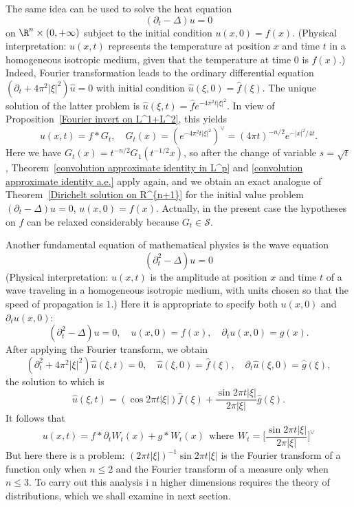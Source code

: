 The same idea can be used to solve the heat equation
\[(\partial_t-\Delta)u=0\]
on $\R^n\times(0,+\infty)$ subject to the initial condition $u(x,0)=f(x)$. (Physical interpretation: $u(x,t)$ represents the temperature at position $x$ and time $t$ in a homogeneous isotropic medium, given that the temperature at time $0$ is $f(x)$.) Indeed, Fourier transformation leads to the ordinary differential equation $(\partial_t+4\pi^2|\xi|^2)\hat{u}=0$ with initial condition $\hat{u}(\xi,0)=\hat{f}(\xi)$. The unique solution of the latter problem is $\hat{u}(\xi,t)=\hat{f}e^{-4\pi^2t|\xi|^2}$. In view of Proposition~\ref{Fourier invert on L^1+L^2}, this yields
\[u(x,t)=f\ast G_t,\quad G_t(x)=(e^{-4\pi^2t|\xi|^2})^{\vee}=(4\pi t)^{-n/2}e^{-|x|^2/4t}.\]
Here we have $G_t(x)=t^{-n/2}G_1(t^{-1/2}x)$, so after the change of variable $s=\sqrt{t}$, Theorem~\ref{convolution approximate identity in L^p} and \ref{convolution approximate identity a.e.} apply again, and we obtain an exact analogue of Theorem~\ref{Dirichelt solution on R^{n+1}} for the initial value problem $(\partial_t-\Delta)u=0$, $u(x,0)=f(x)$. Actually, in the present case the hypotheses on $f$ can be relaxed considerably because $G_t\in\mathscr{S}$.\par
Another fundamental equation of mathematical physics is the wave equation
\[(\partial_t^2-\Delta)u=0\]
(Physical interpretation: $u(x,t)$ is the amplitude at position $x$ and time $t$ of a wave traveling in a homogeneous isotropic medium, with units chosen so that the speed of propagation is $1$.) Here it is appropriate to specify both $u(x,0)$ and $\partial_tu(x,0)$:
\[(\partial_t^2-\Delta)u=0,\quad u(x,0)=f(x),\quad \partial_tu(x,0)=g(x).\]
After applying the Fourier transform, we obtain
\[(\partial_t^2+4\pi^2|\xi|^2)\hat{u}(\xi,t)=0,\quad \hat{u}(\xi,0)=\hat{f}(\xi),\quad \partial_t\hat{u}(\xi,0)=\hat{g}(\xi),\]
the solution to which is
\[\hat{u}(\xi,t)=(\cos 2\pi t|\xi|)\hat{f}(\xi)+\frac{\sin 2\pi t|\xi|}{2\pi|\xi|}\hat{g}(\xi).\]
It follows that
\[u(x,t)=f\ast\partial_tW_t(x)+g\ast W_t(x)\ \ \text{where}\ \ W_t=\Big[\frac{\sin 2\pi t|\xi|}{2\pi|\xi|}\Big]^{\vee}\]
But here there is a problem: $(2\pi t|\xi|)^{-1}\sin 2\pi t|\xi|$ is the Fourier transform of a function only when $n\leq 2$ and the Fourier transform of a measure only when $n\leq 3$. To carry out this analysis i n higher dimensions requires the theory of distributions, which we shall examine in next section.
\newpage
